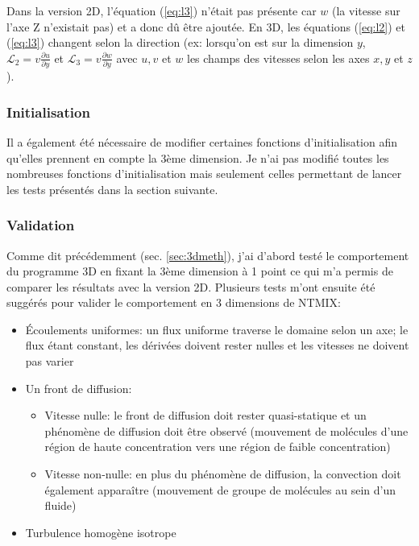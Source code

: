 Dans la version 2D, l'équation (\ref{eq:l3}) n'était pas présente car $w$ (la vitesse sur l'axe Z n'existait pas) et a donc dû être ajoutée. En 3D, les équations (\ref{eq:l2}) et (\ref{eq:l3}) changent selon la direction (ex: lorsqu'on est sur la dimension $y$, $\mathcal{L}_2 = v \frac{\partial u}{\partial y}$ et $\mathcal{L}_3 = v \frac{\partial w}{\partial y}$ avec $u,v$ et $w$ les champs des vitesses selon les axes $x,y$ et $z$).

\subsubsection{Initialisation}Il a également été nécessaire de modifier certaines fonctions d'initialisation afin qu'elles prennent en compte la 3ème dimension. Je n'ai pas modifié toutes les nombreuses fonctions d'initialisation mais seulement celles permettant de lancer les tests présentés dans la section suivante.





\subsubsection{Validation}\label{sec:3D-validation}
Comme dit précédemment (sec. \ref{sec:3dmeth}), j'ai d'abord testé le comportement du programme 3D en fixant la 3ème dimension à 1 point ce qui m'a permis de comparer les résultats avec la version 2D. Plusieurs tests m'ont ensuite été suggérés pour valider le comportement en 3 dimensions de NTMIX:

\begin{itemize}
\item Écoulements uniformes: un flux uniforme traverse le domaine selon un axe; le flux étant constant, les dérivées doivent rester nulles et les vitesses ne doivent pas varier
\item Un front de diffusion:
  \begin{itemize}
  \item Vitesse nulle: le front de diffusion doit rester quasi-statique et un phénomène de diffusion doit être observé (mouvement de molécules d'une région de haute concentration vers une région de faible concentration)
  \item Vitesse non-nulle: en plus du phénomène de diffusion, la convection doit également apparaître (mouvement de groupe de molécules au sein d'un fluide)
  \end{itemize}
\item Turbulence homogène isotrope
\end{itemize}

